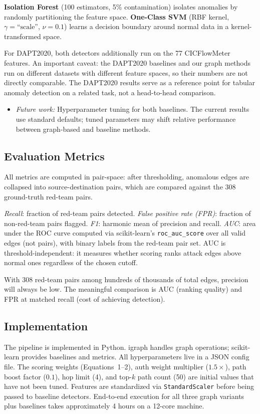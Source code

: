 \textbf{Isolation Forest} (100 estimators, 5\% contamination) isolates anomalies by randomly partitioning the feature space. \textbf{One-Class SVM} (RBF kernel, $\gamma{=}\text{``scale''}$, $\nu{=}0.1$) learns a decision boundary around normal data in a kernel-transformed space.

For DAPT2020, both detectors additionally run on the 77 CICFlowMeter features. An important caveat: the DAPT2020 baselines and our graph methods run on different datasets with different feature spaces, so their numbers are not directly comparable. The DAPT2020 results serve as a reference point for tabular anomaly detection on a related task, not a head-to-head comparison.

\begin{itemize}
\item \textit{Future work:} Hyperparameter tuning for both baselines. The current results use standard defaults; tuned parameters may shift relative performance between graph-based and baseline methods.
\end{itemize}

\subsection{Evaluation Metrics}

All metrics are computed in pair-space: after thresholding, anomalous edges are collapsed into source-destination pairs, which are compared against the 308 ground-truth red-team pairs.

\emph{Recall}: fraction of red-team pairs detected. \emph{False positive rate (FPR)}: fraction of non-red-team pairs flagged. \emph{F1}: harmonic mean of precision and recall. \emph{AUC}: area under the ROC curve computed via scikit-learn's \texttt{roc\_auc\_score} over all valid edges (not pairs), with binary labels from the red-team pair set. AUC is threshold-independent: it measures whether scoring ranks attack edges above normal ones regardless of the chosen cutoff.

With 308 red-team pairs among hundreds of thousands of total edges, precision will always be low. The meaningful comparison is AUC (ranking quality) and FPR at matched recall (cost of achieving detection).

\subsection{Implementation}

The pipeline is implemented in Python. igraph handles graph operations; scikit-learn provides baselines and metrics. All hyperparameters live in a JSON config file. The scoring weights (Equations~1--2), auth weight multiplier ($1.5\times$), path boost factor ($0.1$), hop limit (4), and top-$k$ path count (50) are initial values that have not been tuned. Features are standardized via \texttt{StandardScaler} before being passed to baseline detectors. End-to-end execution for all three graph variants plus baselines takes approximately 4 hours on a 12-core machine.

